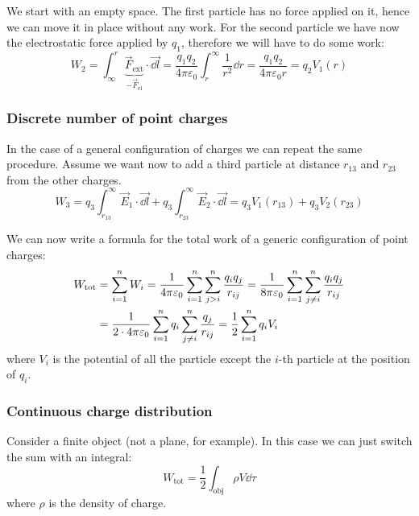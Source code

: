 \documentclass[12pt]{extarticle}
\begin{document}
We start with an empty space.
The first particle has no force applied on it, hence we can move it in place without any work.
For the second particle we have now the electrostatic force applied by $q_1$, therefore we will have to do some work:
\begin{equation}
    W_2 = \int_\infty^r \underbrace{\vec F_\text{ext}}_{-\vec F_\text{el}} \cdot \vec{\dd{l}} = \frac{q_1 q_2}{4 \pi \varepsilon_0} \int_r^\infty \frac{1}{r^2} \dd{r} = \frac{q_1 q_2}{4 \pi \varepsilon_0 r} = q_2 V_1(r)
\end{equation}

\subsubsection{Discrete number of point charges}

In the case of a general configuration of charges we can repeat the same procedure.
Assume we want now to add a third particle at distance $r_{13}$ and $r_{23}$ from the other charges.
\begin{equation}
    W_3 = q_3 \int_{r_{13}}^\infty \vec E_1 \cdot \vec{\dd{l}} + q_3 \int_{r_{23}}^\infty \vec E_2 \cdot \vec{\dd{l}} = q_3V_1(r_{13}) + q_3 V_2(r_{23})
\end{equation}

We can now write a formula for the total work of a generic configuration of point charges:
\begin{align}
    W_\text{tot} & = \sum^n_{i = 1} W_i = \frac{1}{4 \pi \varepsilon_0} \sum^n_{i = 1} \sum_{j > i}^n \frac{q_i q_j}{r_{ij}} = \frac{1}{8 \pi \varepsilon_0} \sum^n_{i = 1} \sum_{j \ne i}^n \frac{q_i q_j}{r_{ij}} \\
                 & = \frac{1}{2 \cdot 4 \pi \varepsilon_0} \sum^n_{i = 1} q_i \sum_{j \ne i}^n \frac{ q_j}{r_{ij}} = \frac{1}{2} \sum_{i = 1}^n q_i V_i
\end{align}
where $V_i$ is the potential of all the particle except the $i$-th particle at the position of $q_i$.

\subsubsection{Continuous charge distribution}

Consider a finite object (not a plane, for example).
In this case we can just switch the sum with an integral:
\begin{equation}
    \label{eq:work-cont-charge}
    W_\text{tot} = \frac{1}{2} \int_\text{obj} \rho V \dd{\tau}
\end{equation}
where $\rho$ is the density of charge.
\end{document}
